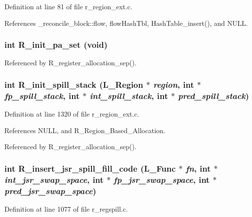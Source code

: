 Definition at line 81 of file r\_\-region\_\-ext.c.

References \_\-reconcile\_\-block::flow, flow\-Hash\-Tbl, Hash\-Table\_\-insert(), and NULL.
\subsubsection{\setlength{\rightskip}{0pt plus 5cm}int R\_\-init\_\-pa\_\-set (void)}\label{r__regproto_8h_01a7a54f9c53bee5a88695b2f267bbce}




Referenced by R\_\-register\_\-allocation\_\-sep().
\subsubsection{\setlength{\rightskip}{0pt plus 5cm}int R\_\-init\_\-spill\_\-stack (L\_\-Region $\ast$ {\em region}, int $\ast$ {\em fp\_\-spill\_\-stack}, int $\ast$ {\em int\_\-spill\_\-stack}, int $\ast$ {\em pred\_\-spill\_\-stack})}\label{r__regproto_8h_2c2815b00141c8c0bbddd3ccfc3ff4e1}




Definition at line 1320 of file r\_\-region\_\-ext.c.

References NULL, and R\_\-Region\_\-Based\_\-Allocation.

Referenced by R\_\-register\_\-allocation\_\-sep().
\subsubsection{\setlength{\rightskip}{0pt plus 5cm}int R\_\-insert\_\-jsr\_\-spill\_\-fill\_\-code (L\_\-Func $\ast$ {\em fn}, int $\ast$ {\em int\_\-jsr\_\-swap\_\-space}, int $\ast$ {\em fp\_\-jsr\_\-swap\_\-space}, int $\ast$ {\em pred\_\-jsr\_\-swap\_\-space})}\label{r__regproto_8h_e8e1bc7ebb045aa975a3d459b9f8cca0}




Definition at line 1077 of file r\_\-regspill.c.


